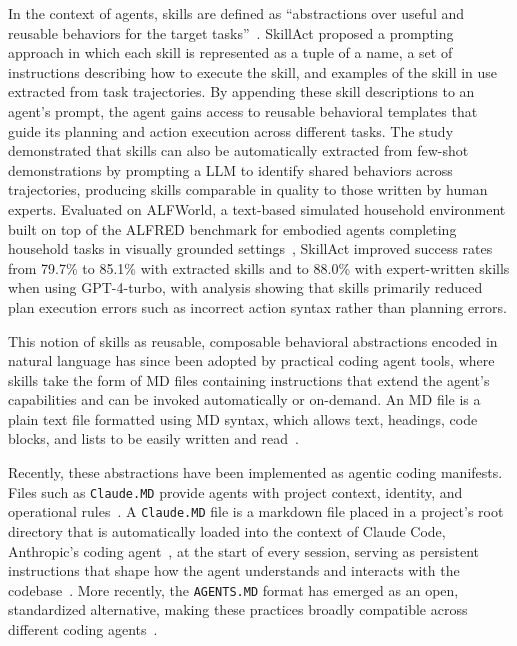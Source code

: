 \documentclass[
english,                 %
bibtex,                  %
]{kththesis}
\numberwithin{listing}{chapter}
\begin{document}
In the context of agents, skills are defined as ``abstractions over useful and reusable behaviors for the target tasks''~\cite{liu_skillact_2024}. SkillAct proposed a prompting approach in which each skill is represented as a tuple of a name, a set of instructions describing how to execute the skill, and examples of the skill in use extracted from task trajectories. By appending these skill descriptions to an agent's prompt, the agent gains access to reusable behavioral templates that guide its planning and action execution across different tasks. The study demonstrated that skills can also be automatically extracted from few-shot demonstrations by prompting a \gls{LLM} to identify shared behaviors across trajectories, producing skills comparable in quality to those written by human experts. Evaluated on \gls{ALF}World, a text-based simulated household environment built on top of the \gls{ALFRED} benchmark for embodied agents completing household tasks in visually grounded settings~\cite{shridhar_alfworld_2021}, SkillAct improved success rates from 79.7\% to 85.1\% with extracted skills and to 88.0\% with expert-written skills when using \gls{GPT}-4-turbo, with analysis showing that skills primarily reduced plan execution errors such as incorrect action syntax rather than planning errors.

This notion of skills as reusable, composable behavioral abstractions encoded in natural language has since been adopted by practical coding agent tools, where skills take the form of \gls{MD} files containing instructions that extend the agent's capabilities and can be invoked automatically or on-demand. An \gls{MD} file is a plain text file formatted using \gls{MD} syntax, which allows text, headings, code blocks, and lists to be easily written and read~\cite{gruber_daring_2004}.

Recently, these abstractions have been implemented as agentic coding manifests. Files such as \texttt{Claude.\gls{MD}} provide agents with project context, identity, and operational rules~\cite{scanniello_use_2026}. A \texttt{Claude.\gls{MD}} file is a markdown file placed in a project's root directory that is automatically loaded into the context of Claude Code, Anthropic's coding agent~\cite{anthropic_pbc_claude_2026}, at the start of every session, serving as persistent instructions that shape how the agent understands and interacts with the codebase~\cite{anthropic_pbc_how_2026}. More recently, the \texttt{AGENTS.\gls{MD}} format has emerged as an open, standardized alternative, making these practices broadly compatible across different coding agents~\cite{lf_projects_llc_agentsmd_2026}.
\end{document}
